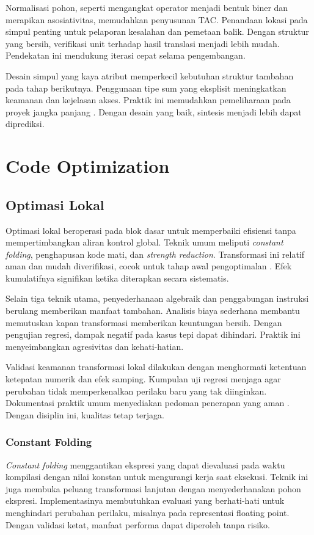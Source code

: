 \documentclass[../main.tex]{subfiles}
\begin{document}
Normalisasi pohon, seperti mengangkat operator menjadi bentuk biner dan merapikan asosiativitas, memudahkan penyusunan TAC. Penandaan lokasi pada simpul penting untuk pelaporan kesalahan dan pemetaan balik. Dengan struktur yang bersih, verifikasi unit terhadap hasil translasi menjadi lebih mudah. Pendekatan ini mendukung iterasi cepat selama pengembangan.

Desain simpul yang kaya atribut memperkecil kebutuhan struktur tambahan pada tahap berikutnya. Penggunaan tipe sum yang eksplisit meningkatkan keamanan dan kejelasan akses. Praktik ini memudahkan pemeliharaan pada proyek jangka panjang \citep{WikiAST}. Dengan desain yang baik, sintesis menjadi lebih dapat diprediksi.

\section{Code Optimization}
\subsection{Optimasi Lokal}
Optimasi lokal beroperasi pada blok dasar untuk memperbaiki efisiensi tanpa mempertimbangkan aliran kontrol global. Teknik umum meliputi \emph{constant folding}, penghapusan kode mati, dan \emph{strength reduction}. Transformasi ini relatif aman dan mudah diverifikasi, cocok untuk tahap awal pengoptimalan \citep{WikiConstantFolding,WikiDCE,WikiStrengthReduction}. Efek kumulatifnya signifikan ketika diterapkan secara sistematis.

Selain tiga teknik utama, penyederhanaan algebraik dan penggabungan instruksi berulang memberikan manfaat tambahan. Analisis biaya sederhana membantu memutuskan kapan transformasi memberikan keuntungan bersih. Dengan pengujian regresi, dampak negatif pada kasus tepi dapat dihindari. Praktik ini menyeimbangkan agresivitas dan kehati-hatian.

Validasi keamanan transformasi lokal dilakukan dengan menghormati ketentuan ketepatan numerik dan efek samping. Kumpulan uji regresi menjaga agar perubahan tidak memperkenalkan perilaku baru yang tak diinginkan. Dokumentasi praktik umum menyediakan pedoman penerapan yang aman \citep{WikiOptimization}. Dengan disiplin ini, kualitas tetap terjaga.

\subsubsection{Constant Folding}
\emph{Constant folding} menggantikan ekspresi yang dapat dievaluasi pada waktu kompilasi dengan nilai konstan untuk mengurangi kerja saat eksekusi. Teknik ini juga membuka peluang transformasi lanjutan dengan menyederhanakan pohon ekspresi. Implementasinya membutuhkan evaluasi yang berhati-hati untuk menghindari perubahan perilaku, misalnya pada representasi floating point. Dengan validasi ketat, manfaat performa dapat diperoleh tanpa risiko.
\end{document}
